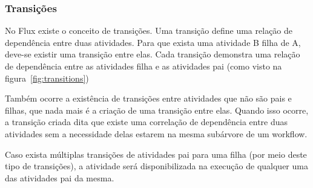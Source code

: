 \subsubsection{Transições} \label{sec:transitions}

No Flux existe o conceito de transições. Uma transição define uma relação de dependência entre duas atividades. Para que exista uma atividade B filha de A, deve-se existir uma transição entre elas. Cada transição demonstra uma relação de dependência entre as atividades filha e as atividades pai (como visto na figura~\ref{fig:transitions})

Também ocorre a existência de transições entre atividades que não são pais e filhas, que nada mais é a criação de uma transição entre elas. Quando isso ocorre, a transição criada dita que existe uma correlação de dependência entre duas atividades sem a necessidade delas estarem na mesma subárvore de um workflow.

Caso exista múltiplas transições de atividades pai para uma filha (por meio deste tipo de transições), a atividade será disponibilizada na execução de qualquer uma das atividades pai da mesma.

